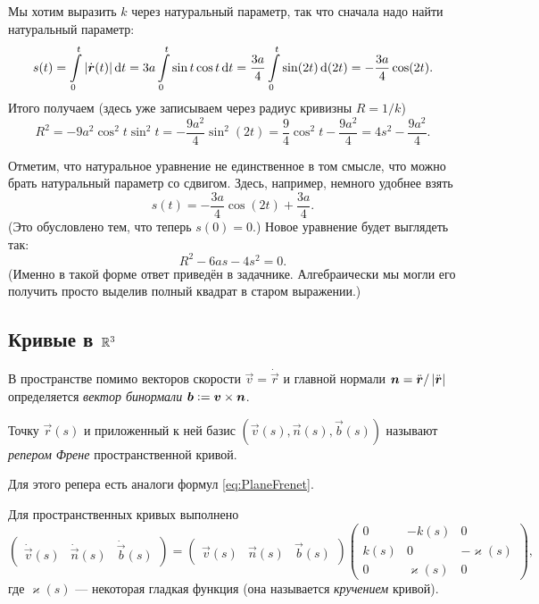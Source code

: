 \begin{solution}
	Мы хотим выразить $k$ через натуральный параметр, так что сначала надо найти натуральный параметр:
	\[
		s(t) = \int\limits_0^t\abs{\dot{\vec{r}}(t)}\d t = 3a\int\limits_0^t\sin t\cos t\d t = \frac{3a}{4}\int\limits_0^t\sin(2t) \d(2t) = -\frac{3a}{4}\cos(2t).
	\]
	Итого получаем (здесь уже записываем через радиус кривизны $R = 1 / k$)
	\[
		R^2 = -9a^2\cos^2t\sin^2t = -\frac{9a^2}{4}\sin^2(2t) = \frac{9}{4}\cos^2t - \frac{9a^2}{4} = 4s^2 - \frac{9a^2}{4}.
	\]

	Отметим, что натуральное уравнение не единственное в том смысле, что можно брать натуральный параметр со сдвигом. Здесь, например, немного удобнее взять
	\[
		s(t) = -\frac{3a}{4}\cos(2t) + \frac{3a}{4}.
	\]
	(Это обусловлено тем, что теперь $s(0) = 0$.) Новое уравнение будет выглядеть так:
	\[
		R^2 - 6as - 4s^2 = 0.
	\]
	(Именно в такой форме ответ приведён в задачнике. Алгебраически мы могли его получить просто выделив полный квадрат в старом выражении.)
\end{solution}

\subsection{Кривые в $\R^3$}

В пространстве помимо векторов скорости $\vec{v} = \dot{\vec{r}}$ и главной нормали $\vec{n} = \ddot{\vec{r}} / \abs{\ddot{\vec{r}}}$ определяется \textit{вектор бинормали} $\vec{b} \vcentcolon = \vec{v} \times \vec{n}$.

\begin{definition}
	Точку $\vec{r}(s)$ и приложенный к ней базис $(\vec{v}(s), \vec{n}(s), \vec{b}(s))$ называют \textit{репером Френе} пространственной кривой.
\end{definition}

Для этого репера есть аналоги формул \eqref{eq:PlaneFrenet}.

\begin{theorem}
	Для пространственных кривых выполнено
	\begin{equation} \label{eq:SpaceFrenet}
		\begin{pmatrix}
			\dot{\vec{v}}(s) & \dot{\vec{n}}(s) & \dot{\vec{b}}(s)
		\end{pmatrix} = 
		\begin{pmatrix}
			\vec{v}(s) & \vec{n}(s) & \vec{b}(s)
		\end{pmatrix}
		\begin{pmatrix}
			0 & -k(s) & 0 \\
			k(s) & 0 & -\varkappa(s) \\
			0 & \varkappa(s) & 0
		\end{pmatrix},
	\end{equation}
	где $\varkappa(s)$ --- некоторая гладкая функция (она называется \textit{кручением} кривой).
\end{theorem}

